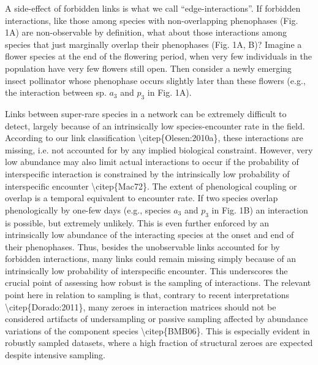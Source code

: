 \documentclass[a4paper,12pt]{article}
\begin{document}
\begin{spacing}{1.0}
A side-effect of forbidden links is what we call ``edge-interactions''. If forbidden interactions, like those among species with non-overlapping phenophases (Fig. 1A) are non-observable by definition, what about those interactions among species that just marginally overlap their phenophases (Fig. 1A, B)? Imagine a flower species at the end of the flowering period, when very few individuals in the population have very few flowers still open. Then consider a newly emerging insect pollinator whose phenophase occurs slightly later than these flowers (e.g., the interaction between sp. $a_3$ and $p_3$ in Fig. 1A). 

Links between super-rare species in a network can be extremely difficult to detect, largely because of an intrinsically low species-encounter rate in the field. According to our link classification \textbackslash{}citep\{Olesen:2010a\}, these interactions are missing, i.e. not accounted for by any implied biological constraint. However, very low abundance may also limit actual interactions to occur if the probability of interspecific interaction is constrained by the intrinsically low probability of interspecific encounter \textbackslash{}citep\{Mac72\}. The extent of phenological coupling or overlap is a temporal equivalent to encounter rate. If two species overlap phenologically by one-few days (e.g., species $a_3$ and $p_3$ in Fig. 1B) an interaction is possible, but extremely unlikely. This is even further enforced by an intrinsically low abundance of the interacting species at the onset and end of their phenophases. Thus, besides the unobservable links accounted for by forbidden interactions, many links could remain missing simply because of an intrinsically low probability of interspecific encounter. This underscores the crucial point of assessing how robust is the sampling of interactions. The relevant point here in relation to sampling is that, contrary to recent interpretations \textbackslash{}citep\{Dorado:2011\}, many zeroes in interaction matrices should not be considered artifacts of undersampling or passive sampling affected by abundance variations of the component species \textbackslash{}citep\{BMB06\}. This is especially evident in robustly sampled datasets, where a high fraction of structural zeroes are expected despite intensive sampling.


\end{spacing}
\end{document}
